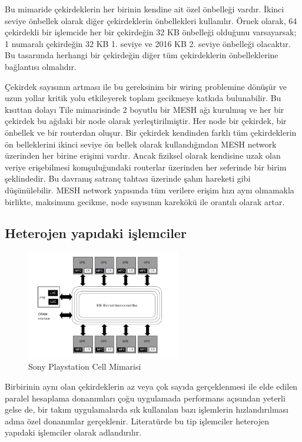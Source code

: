 \newpage Bu mimaride çekirdeklerin her birinin kendine ait özel önbelleği vardır. İkinci seviye önbellek olarak diğer çekirdeklerin önbellekleri kullanılır. Örnek olarak, 64 çekirdekli bir işlemcide her bir çekirdeğin 32 KB önbelleği olduğunu varsayarsak; 1 numaralı çekirdeğin 32 KB 1. seviye ve 2016 KB 2. seviye önbelleği olacaktır. Bu tasarımda herhangi bir çekirdeğin diğer tüm çekirdeklerin önbelleklerine bağlantısı olmalıdır.\par

Çekirdek sayısının artması ile bu gereksinim bir wiring problemine dönüşür ve uzun yollar kritik yolu etkileyerek toplam gecikmeye katkıda bulunabilir. Bu kısıttan dolayı Tile mimarisinde 2 boyutlu bir MESH ağı kurulmuş ve her bir çekirdek bu ağdaki bir node olarak yerleştirilmiştir. Her node bir çekirdek, bir önbellek ve bir routerdan oluşur. Bir çekirdek kendinden farklı tüm çekirdeklerin ön belleklerini ikinci seviye ön bellek olarak kullandığından MESH network üzerinden her birine erişimi vardır. Ancak fiziksel olarak kendisine uzak olan veriye erişebilmesi komşuluğundaki routerlar üzerinden her seferinde bir birim şeklindedir. Bu davranış satranç tahtası üzerinde şahın hareketi gibi düşünülebilir. MESH network yapısında tüm verilere erişim hızı aynı olmamakla birlikte, maksimum gecikme, node sayısının karekökü ile orantılı olarak artar. 



\subsection{Heterojen yapıdaki işlemciler}
\begin{figure}
\centering
\shorthandoff{=}
\includegraphics[width=0.6\textwidth]{gorsel/playStationArchitecture.png}
\shorthandoff{=}
\caption{Sony Playstation Cell Mimarisi}
\label{image:playStationArchitecture}
\end{figure}

Birbirinin aynı olan çekirdeklerin az veya çok sayıda gerçeklenmesi ile elde edilen paralel hesaplama donanımları çoğu uygulamada performans açısından yeterli gelse de, bir takım uygulamalarda sık kullanılan bazı işlemlerin hızlandırılması adına özel donanımlar gerçeklenir. Literatürde bu tip işlemciler heterojen yapıdaki işlemciler olarak adlandırılır.\par 

